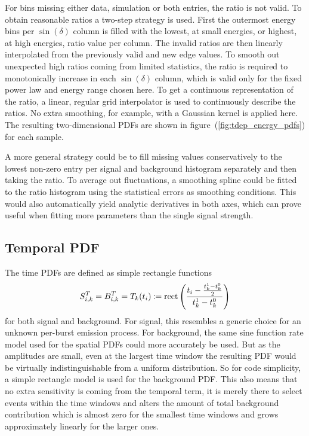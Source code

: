 For bins missing either data, simulation or both entries, the ratio is not valid.
To obtain reasonable ratios a two-step strategy is used.
First the outermost energy bins per $\sin(\delta)$ column is filled with the lowest, at small energies, or highest, at high energies, ratio value per column.
The invalid ratios are then linearly interpolated from the previously valid and new edge values.
To smooth out unexpected high ratios coming from limited statistics, the ratio is required to monotonically increase in each $\sin(\delta)$ column, which is valid only for the fixed power law and energy range chosen here.
To get a continuous representation of the ratio, a linear, regular grid interpolator is used to continuously describe the ratios.
No extra smoothing, for example, with a Gaussian kernel is applied here.
The resulting two-dimensional PDFs are shown in figure~(\ref{fig:tdep_energy_pdfs}) for each sample.

A more general strategy could be to fill missing values conservatively to the lowest non-zero entry per signal and background histogram separately and then taking the ratio.
To average out fluctuations, a smoothing spline could be fitted to the ratio histogram using the statistical errors as smoothing conditions.
This would also automatically yield analytic derivatives in both axes, which can prove useful when fitting more parameters than the single signal strength.

\subsection*{Temporal PDF}
The time PDFs are defined as simple rectangle functions
\begin{equation}
  S_{i,k}^T = B_{i,k}^T = T_k(t_i) \coloneqq
    \operatorname{rect}\left(\frac{t_i - \frac{t_k^1-t_k^0}{2}}
                              {t_k^1-t_k^0}\right)
\end{equation}
for both signal and background.
For signal, this resembles a generic choice for an unknown per-burst emission process.
For background, the same sine function rate model used for the spatial PDFs could more accurately be used.
But as the amplitudes are small, even at the largest time window the resulting PDF would be virtually indistinguishable from a uniform distribution.
So for code simplicity, a simple rectangle model is used for the background PDF.
This also means that no extra sensitivity is coming from the temporal term, it is merely there to select events within the time windows and alters the amount of total background contribution which is almost zero for the smallest time windows and grows approximately linearly for the larger ones.

